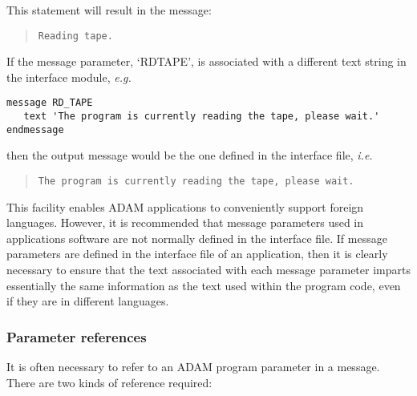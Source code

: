 \documentclass[twoside,11pt]{article}
\newcommand{\xlabel}[1]{}
\renewcommand{\_}{\texttt{\symbol{95}}}
\begin{document}
This statement will result in the message:

\begin {quote}
\begin {small}
\begin{verbatim}
Reading tape.
\end{verbatim}
\end {small}
\end {quote}

If the message parameter, `RD\_TAPE', is associated with a  different text
string in the interface module, \textit{e.g.}

\begin {small}
\begin{verbatim}
message RD_TAPE
   text 'The program is currently reading the tape, please wait.'
endmessage
\end{verbatim}
\end {small}

then the output message would be the one defined in the interface file, {\em
i.e.}

\begin {quote}
\begin {small}
\begin{verbatim}
The program is currently reading the tape, please wait.
\end{verbatim}
\end {small}
\end {quote}

This facility enables ADAM applications to conveniently support foreign
languages. 
However, it is recommended that message parameters used in applications
software are not normally defined in the interface file.
If message parameters are defined in the interface file of an application,
then it is clearly necessary to ensure that the text associated with each
message parameter imparts essentially the same information as the text used
within the program code, even if they are in different languages. 


\subsubsection{\xlabel{parameter_reefrences}Parameter references\label{parameter_references}}

It is often necessary to refer to an ADAM program parameter in a message. 
There are two kinds of reference required: 
\end{document}
